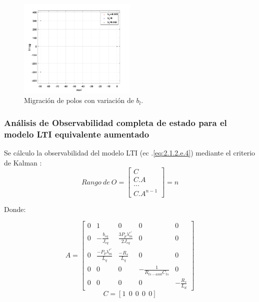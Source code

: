 \documentclass[10pt]{article}
\begin{document}
\begin{itemize}
			\begin{figure}[h!]
	\centering
	\includegraphics[width=0.5\textwidth]{varpolosbl.png}
	\caption{\label{fig:varpolosbl} Migración de polos con variación de $b_{l}$.}
	\end{figure}

\end{itemize}
\subsubsection{Análisis de Observabilidad completa de estado para el modelo LTI equivalente aumentado}
Se cálculo la observabilidad del modelo LTI (ec .\ref{eq:2.1.2.e.4}) mediante el criterio de Kalman :
	\begin{equation}
	Rango \ de\  O=
	\begin{bmatrix}
	
		C\\ 
		C.A\\ 
		...\\ 
		C.A^{n-1}
		\end{bmatrix}=n
	\label{eq:2.1.2.kk.1}
	\end{equation}
	
	Donde:
	
		\begin{equation}
		A=\begin{bmatrix}
	0 & 1 &0 &0&0\\ 
	0 & -\frac{b_{eq}}{J_{eq}} & \frac{3 P_{p} \lambda^{r'}_{m}}{2 J_{eq}} & 0&0\\ 
	0  & \frac{- P_{p} \lambda^{r'}_{m}}{ L_{q}} & \frac{-R_{s}}{L_{q}} & 0&0\\
	0 & 0 & 0 & -\frac{1}{R_{ts-amb} C_{ts}}&0\\
	0&0&0&0&-\frac{R_{s}}{L_{d}}
	\end{bmatrix}
	\label{eq:2.1.2.kk.2}
	\end{equation}
	\begin{equation}
		C=[1 \ \ 0 \ \ 0 \ \ 0 \ \ 0 ] 
	\label{eq:2.1.2.k.3}
	\end{equation}
\end{document}

